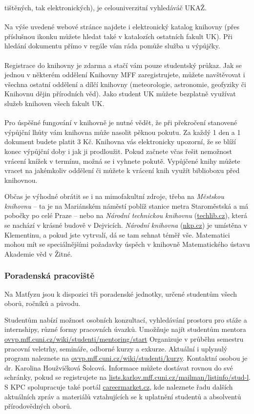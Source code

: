 tištěných, tak elektronických), je celouniverzitní vyhledáváč UKAŽ.
\\\\
Na výše uvedené webové stránce najdete i elektronický katalog knihovny (přes
příslušnou ikonku můžete hledat také v katalozích ostatních fakult UK). Při
hledání dokumentu přímo v regále vám ráda pomůže služba u výpůjčky.
\\\\
Registrace do knihovny je zdarma a stačí vám pouze studentský průkaz. Jak se
jednou v některém oddělení Knihovny MFF zaregistrujete, můžete navštěvovat i
všechna ostatní oddělení a dílčí knihovny (meteorologie, astronomie, geofyziky
či Knihovnu dějin přírodních věd). Jako student UK můžete bezplatně využívat
služeb knihoven všech fakult UK.
\\\\
Pro úspěšné fungování v knihovně je nutné vědět, že při překročení stanovené
výpůjční lhůty vám knihovna může nasolit pěknou pokutu. Za každý 1 den a 1
dokument budete platit 3 Kč. Knihovna vás elektronicky upozorní, že se blíží
konec výpůjční doby i jak ji prodloužit. Pokud začnete včas řešit nemožnost
vrácení knížek v termínu, možná se i vyhnete pokutě. Vypůjčené knihy můžete
vracet na jakémkoliv oddělení či můžete k vrácení knih využít biblioboxu před
knihovnou.


Občas je výhodné obrátit se i na mimofakultní zdroje, třeba na \textit{Městskou
knihovnu} – ta je na Mariánském náměstí poblíž stanice metra Staroměstská a má
pobočky po celé Praze – nebo na \textit{Národní technickou knihovnu}
(\url{techlib.cz}), která se nachází v krásné budově v Dejvicích.
\textit{Národní knihovna} (\url{nkp.cz}) je umístěna v Klementinu, a pokud jste
vytrvalí, dá se tam sehnat téměř vše. Matematici mohou mít se speciálnějšími
požadavky úspěch v knihovně Matematického ústavu Akademie věd v Žitné.


\subsubsection{Poradenská pracoviště}
Na Matfyzu jsou k dispozici tři poradenské jednotky, určené studentům všech
oborů, ročníků a původu.


Studentům nabízí možnost osobních konzultací, vyhledávání prostoru pro stáže a
internshipy, různé formy pracovních úvazků. Umožňuje najít studentům mentora
\url{ovvp.mff.cuni.cz/wiki/studenti/mentoring/start} Organizuje v průběhu
semestru pracovní veletrhy, semináře, odborné kurzy a exkurze. Aktuální i
uplynulý program naleznete na \url{ovvp.mff.cuni.cz/wiki/studenti/kurzy}.
Kontaktní osobou je dr. Karolina Houžvičková Šolcová. Informace můžete dostávat
rovnou do své schránky, pokud se registrujete na
\url{lists.karlov.mff.cuni.cz/mailman/listinfo/stud-l}. S KPC spolupracuje také
portál \url{careermarket.cz}, kde naleznete řadu dalších aktuálních zpráv a
materiálů vztahujících se k uplatnění studentů a absolventů přírodovědných
oborů.


